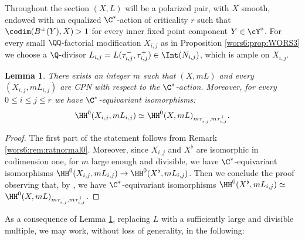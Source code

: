 \documentclass[reqno]{amsproc}
\newtheorem{lemma}[theorem]{Lemma}
\theoremstyle{definition}
\begin{document}
Throughout the section $(X,L)$ will  be a polarized pair, with $X$ smooth, endowed with an equalized $\C^*$-action of criticality $r$ such that  $\codim(B^\pm(Y),X)>1$ for every inner fixed point component $Y\in\cY^\circ$. 
For every small $\QQ$-factorial modification $X_{i,j}$ as in Proposition \ref{wors6:prop:WORS3} we choose a $\Q$-divisor $L_{i,j}=L(\tau_{i,j}^-,\tau_{i,j}^+) \in\Int(N_{i,j})$, which is  ample on $X_{i,j}$.


\begin{lemma}\label{wors6:lem:manyCPNs}
There exists an integer $m$ such that $(X,mL)$ and every $(X_{i,j},mL_{i,j})$ are CPN  with respect to the $\C^*$-action. Moreover, for every $0 \le i \le j\le r$ we have $\C^*$-equivariant isomorphisms:
$$
\HH^0(X_{i,j},mL_{i,j})\simeq \HH^0(X,mL)_{m\tau_{i,j}^-,m\tau_{i,j}^+}.
$$  
\end{lemma}

\begin{proof}
The first part of the statement follows from Remark \ref{wors6:rem:ratnormal0}. Moreover, since $X_{i,j}$ and $X^\flat$ are isomorphic in codimension one, for $m$ large enough and divisible, we have $\C^*$-equivariant isomorphisms $\HH^0(X_{i,j},mL_{i,j})\to \HH^0(X^\flat,mL_{i,j})$. Then we conclude the proof observing that,  by \cite[Lemma~2.5]{wors6-WORS3}, we have $\C^*$-equivariant isomorphisms $\HH^0(X^\flat,mL_{i,j})\simeq $ $\HH^0(X,mL)_{m\tau_{i,j}^-,m\tau_{i,j}^+}$.
\end{proof}

As a consequence of  Lemma \ref{wors6:lem:manyCPNs}, replacing $L$ with a sufficiently large and divisible multiple, we may work, without loss of generality, in the following: 
\end{document}
